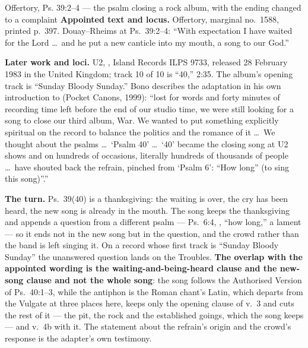 \begin{afterlife}{Offertory, Ps. 39:2--4 --- the psalm closing a rock album, with the ending changed to a complaint}
\textbf{Appointed text and locus.} Offertory, marginal no.~1588, printed p.~397.
Douay--Rheims at Ps.\ 39:2--4: ``With expectation I have waited for the Lord \dots\
and he put a new canticle into my mouth, a song to our God.''

\textbf{Later work and loci.} U2, , Island Records ILPS 9733, released
28 February 1983 in the United Kingdom; track 10 of 10 is ``40,'' 2:35. The
album's opening track is ``Sunday Bloody Sunday.'' Bono describes the adaptation
in his own introduction to \work{Selections from the Book of Psalms} (Pocket
Canons, 1999): ``lost for words and forty minutes of recording time left
before the end of our studio time, we were still looking for a song to close our
third album, War. We wanted to put something explicitly spiritual on the record to
balance the politics and the romance of it \dots\ We thought about the psalms
\dots\ `Psalm 40' \dots\ `40' became the closing song at U2 shows and on hundreds
of occasions, literally hundreds of thousands of people \dots\ have shouted back
the refrain, pinched from `Psalm 6': ``How long'' (to sing this song)''.''

\textbf{The turn.} Ps.\ 39(40) is a thanksgiving: the waiting is over, the cry has
been heard, the new song is already in the mouth. The song keeps the thanksgiving
and appends a question from a different psalm --- Ps.\ 6:4, \latin{usquequo},
``how long,'' a lament --- so it ends not in the new song but in the question, and
the crowd rather than the band is left singing it. On a record whose first track
is ``Sunday Bloody Sunday'' the unanswered question lands on the Troubles.
\textbf{The overlap with the appointed wording is the waiting-and-being-heard
clause and the new-song clause and not the whole song}: the song follows the
Authorised Version of Ps.\ 40:1--3, while the antiphon is the Roman chant's Latin,
which departs from the Vulgate at three places here, keeps only the opening
clause of v.~3 and cuts the rest of it --- the pit, the rock and the established
goings, which the song keeps --- and v.~4b with it. The
statement about the refrain's origin and the crowd's response is the adapter's own
testimony.
\end{afterlife}


